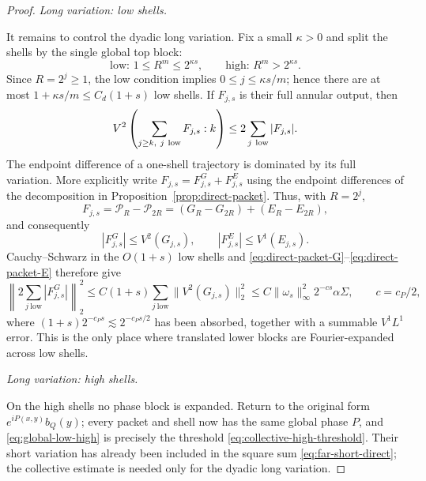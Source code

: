 \documentclass[11pt]{article}
\numberwithin{equation}{section}
\theoremstyle{remark}
\theoremstyle{definition}
\newcommand{\norm}[1]{\lVert #1\rVert}
\begin{document}
\begin{proof}
\smallskip
\noindent\emph{Long variation: low shells.}

It remains to control the dyadic long variation.  Fix a small
$\kappa>0$ and split the shells by the single global top block:
\begin{equation}\label{eq:global-low-high}
 \text{low: }1\le R^m\le2^{\kappa s},
 \qquad
 \text{high: }R^m>2^{\kappa s}.
\end{equation}
Since $R=2^j\ge1$, the low condition implies
$0\le j\le\kappa s/m$; hence there are at most
$1+\kappa s/m\le C_d(1+s)$ low shells.  If $F_{j,s}$ is their full
annular output, then
\[
 V^2\left(\sum_{j\ge k,\ j\ {\rm low}}F_{j,s}:k\right)
 \le2\sum_{j\ {\rm low}}|F_{j,s}|.
\]
The endpoint difference of a one-shell trajectory is dominated by its
full variation.  More explicitly write
$F_{j,s}=F^G_{j,s}+F^E_{j,s}$ using the endpoint differences of the
decomposition in Proposition~\ref{prop:direct-packet}.  Thus, with
$R=2^j$,
\[
 F_{j,s}=\mathcal P_R-\mathcal P_{2R}
 =(G_R-G_{2R})+(E_R-E_{2R}),
\]
and consequently
\[
 |F^G_{j,s}|\le V^2(G_{j,s}),\qquad
 |F^E_{j,s}|\le V^1(E_{j,s}).
\]
Cauchy--Schwarz in the $O(1+s)$ low shells and
\eqref{eq:direct-packet-G}--\eqref{eq:direct-packet-E} therefore give
\begin{equation}\label{eq:far-low-long}
 \left\|2\sum_{j\ \mathrm{low}}|F^G_{j,s}|\right\|_2^2
 \le C(1+s)\sum_{j\ \mathrm{low}}
       \norm{V^2(G_{j,s})}_2^2
 \le C\norm{\omega_s}_\infty^2 2^{-cs}\alpha\Sigma,
 \qquad c=c_P/2,
\end{equation}
where $(1+s)2^{-c_Ps}\lesssim2^{-c_Ps/2}$ has been absorbed, together
with a summable $V^1L^1$ error.  This is the only place where translated
lower blocks are Fourier-expanded across low shells.

\smallskip
\noindent\emph{Long variation: high shells.}

On the high shells no phase block is expanded.  Return to the original
form $e^{iP(x,y)}b_Q(y)$; every packet and shell now has the same global
phase $P$, and \eqref{eq:global-low-high} is precisely the threshold
\eqref{eq:collective-high-threshold}.  Their short variation has already
been included in the square sum \eqref{eq:far-short-direct}; the
collective estimate is needed only for the dyadic long variation.


\end{proof}
\end{document}
